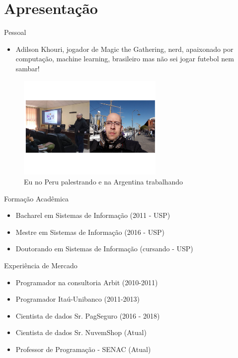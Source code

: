 \section*{Apresentação}

\begin{frame}	
	\begin{block}{Pessoal}	
		\begin{itemize}
			\item Adilson Khouri,  jogador de Magic the Gathering, nerd, apaixonado por computação, machine learning, brasileiro mas não sei jogar futebol nem sambar!
		\end{itemize}
		\begin{figure}[!htb]
			\centering	  				
			\includegraphics[height=5cm, width = 7cm]{./pic/join.png}
			\caption{Eu no Peru palestrando e na Argentina trabalhando}
			\label{fig_adilson_argentina}
		\end{figure}
		
	\end{block}
\end{frame}
			
\begin{frame}	
	\begin{block}{Formação Acadêmica}
		 \begin{itemize}
			  \item Bacharel em Sistemas de Informação (2011 - USP)
			  \item Mestre em Sistemas de Informação (2016 - USP)
			  \item Doutorando em Sistemas de Informação (cursando - USP)
		  \end{itemize}
	\end{block}
\end{frame}

\begin{frame}	
	\begin{block}{Experiência de Mercado}
		\begin{itemize}
			\item Programador na consultoria Arbit (2010-2011)
			\item Programador Itaú-Unibanco (2011-2013)
			\item Cientista de dados Sr. PagSeguro (2016 - 2018)
			\item Cientista de dados Sr. NuvemShop (Atual)
			\item Professor de Programação - SENAC (Atual)
		\end{itemize}
	\end{block}
\end{frame}
